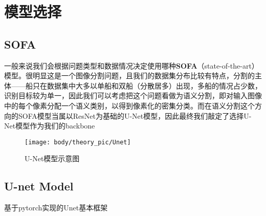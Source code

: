 
\chapter{模型选择}\label{ux6a21ux578bux9009ux62e9}

\section{SOFA}\label{sofa}

一般来说我们会根据问题类型和数据情况决定使用哪种\textbf{SOFA}（state-of-the-art）模型。很明显这是一个图像分割问题，且我们的数据集分布比较有特点，分割的主体------船只在数据集中大多以单船和双船（分散居多）出现，多船的情况占少数，识别目标较为单一，因此我们可以考虑把这个问题看做为语义分割，即对输入图像中的每个像素分配一个语义类别，以得到像素化的密集分类。而在语义分割这个方向的SOFA模型当属以ResNet为基础的U-Net模型，因此最终我们敲定了选择U-Net模型作为我们的backbone

\begin{figure}[htbp]
\centering
\texttt{[image: body/theory\_pic/Unet]}
\caption{U-Net模型示意图}
\label{fig::theory1}
\end{figure}

\section{U-net Model}\label{u-net-model}

基于pytorch实现的Unet基本框架

